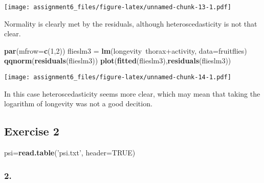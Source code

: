 \documentclass[11pt,]{article}
\newenvironment{Shaded}{\begin{snugshade}}{\end{snugshade}}
\newcommand{\KeywordTok}[1]{\textcolor[rgb]{0.13,0.29,0.53}{\textbf{{#1}}}}
\newcommand{\DataTypeTok}[1]{\textcolor[rgb]{0.13,0.29,0.53}{{#1}}}
\newcommand{\DecValTok}[1]{\textcolor[rgb]{0.00,0.00,0.81}{{#1}}}
\newcommand{\StringTok}[1]{\textcolor[rgb]{0.31,0.60,0.02}{{#1}}}
\newcommand{\OtherTok}[1]{\textcolor[rgb]{0.56,0.35,0.01}{{#1}}}
\newcommand{\NormalTok}[1]{{#1}}
\begin{document}
\texttt{[image: assignment6\_files/figure-latex/unnamed-chunk-13-1.pdf]}

Normality is clearly met by the residuals, although heteroscedasticity
is not that clear.

\begin{Shaded}
\begin{Highlighting}[]
\KeywordTok{par}\NormalTok{(}\DataTypeTok{mfrow=}\KeywordTok{c}\NormalTok{(}\DecValTok{1}\NormalTok{,}\DecValTok{2}\NormalTok{))}
\NormalTok{flieslm3 =}\StringTok{ }\KeywordTok{lm}\NormalTok{(longevity~thorax+activity, }\DataTypeTok{data=}\NormalTok{fruitflies)}
\KeywordTok{qqnorm}\NormalTok{(}\KeywordTok{residuals}\NormalTok{(flieslm3))}
\KeywordTok{plot}\NormalTok{(}\KeywordTok{fitted}\NormalTok{(flieslm3),}\KeywordTok{residuals}\NormalTok{(flieslm3))}
\end{Highlighting}
\end{Shaded}

\texttt{[image: assignment6\_files/figure-latex/unnamed-chunk-14-1.pdf]}

In this case heteroscedasticity seems more clear, which may mean that
taking the logarithm of longevity was not a good decition.

\subsection{Exercise 2}\label{exercise-2}

\begin{Shaded}
\begin{Highlighting}[]
\NormalTok{psi=}\KeywordTok{read.table}\NormalTok{(}\StringTok{'psi.txt'}\NormalTok{, }\DataTypeTok{header=}\OtherTok{TRUE}\NormalTok{)}
\end{Highlighting}
\end{Shaded}

\subsubsection{2.}\label{section-8}

\begin{Shaded}
\end{Shaded}
\end{document}

